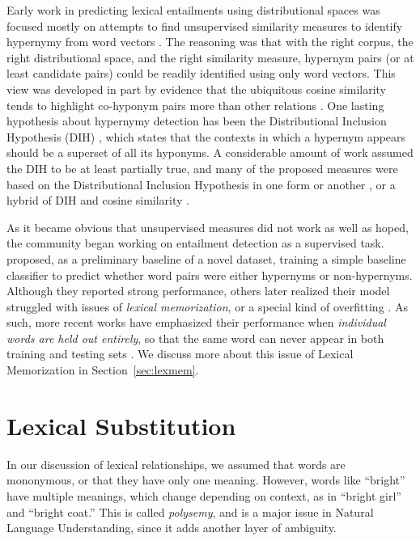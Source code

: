 Early work in predicting lexical entailments using distributional spaces was
focused mostly on attempts to find unsupervised similarity measures to identify
hypernymy from word vectors
\cite{weeds:2004:coling,clarke:2009:gems,kotlerman:2010:nle,lenci:2012:starsem,santus:2013:thesis}.
The reasoning was that with the right corpus, the right
distributional space, and the right similarity measure, hypernym pairs
(or at least candidate pairs) could be readily identified using only word
vectors. This view was developed in part by evidence that the ubiquitous
cosine similarity tends to highlight co-hyponym pairs more than other relations
\cite{weeds:2004:coling,baroni:2011:gems}.  One lasting hypothesis about
hypernymy detection has been the Distributional Inclusion Hypothesis (DIH)
\cite{zhitomirsky-geffet:2005:acl}, which states that the contexts in which a
hypernym appears should be a superset of all its hyponyms. A considerable
amount of work assumed the DIH to be at least partially true, and many of the
proposed measures were based on the Distributional Inclusion Hypothesis in one
form or another \cite{clarke:2009:gems}, or a hybrid of DIH and cosine
similarity \cite{kotlerman:2010:nle,lenci:2012:starsem}.

As it became obvious that unsupervised measures did not work as
well as hoped, the community began working on entailment detection as a
supervised task.  proposed, as a preliminary baseline
of a novel dataset, training a simple baseline classifier to predict whether
word pairs were either hypernyms or non-hypernyms. Although they reported strong performance,
others later realized their model struggled with issues of {\em lexical
memorization}, or a special kind of overfitting
\cite{roller:2014:coling,weeds:2014:coling,levy:2015:naacl}. As such, more
recent works have emphasized their performance when {\em individual words are
held out entirely}, so that the same word can never appear in both training and
testing sets
\cite{roller:2014:coling,kruszewski:2015:tacl,levy:2015:naacl,shwartz:2016:acl,roller:2016:naacl}.
We discuss more about this issue of Lexical Memorization in
Section~\ref{sec:lexmem}.

\section{Lexical Substitution}
\label{sec:lexsub}

In our discussion of lexical relationships, we assumed that words are
mononymous, or that they have only one meaning. However, words like ``bright''
have multiple meanings, which change depending on context, as in ``bright
girl'' and ``bright coat.'' This is called {\em polysemy}, and is a major issue
in Natural Language Understanding, since it adds another layer of ambiguity.

